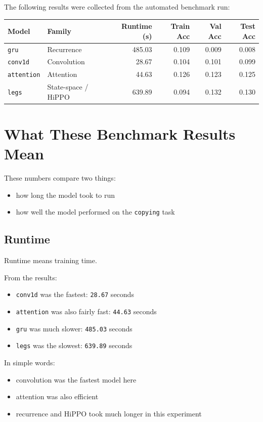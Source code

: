 \documentclass[12pt]{article}
\begin{document}
The following results were collected from the automated benchmark run:

\begin{center}
\begin{tabular}{l l r r r r}
\toprule
Model & Family & Runtime (s) & Train Acc & Val Acc & Test Acc \\
\midrule
\texttt{gru} & Recurrence & 485.03 & 0.109 & 0.009 & 0.008 \\
\texttt{conv1d} & Convolution & 28.67 & 0.104 & 0.101 & 0.099 \\
\texttt{attention} & Attention & 44.63 & 0.126 & 0.123 & 0.125 \\
\texttt{legs} & State-space / HiPPO & 639.89 & 0.094 & 0.132 & 0.130 \\
\bottomrule
\end{tabular}
\end{center}

\section*{What These Benchmark Results Mean}

These numbers compare two things:

\begin{itemize}
    \item how long the model took to run
    \item how well the model performed on the \texttt{copying} task
\end{itemize}

\subsection*{Runtime}

Runtime means training time.

From the results:

\begin{itemize}
    \item \texttt{conv1d} was the fastest: \texttt{28.67} seconds
    \item \texttt{attention} was also fairly fast: \texttt{44.63} seconds
    \item \texttt{gru} was much slower: \texttt{485.03} seconds
    \item \texttt{legs} was the slowest: \texttt{639.89} seconds
\end{itemize}

In simple words:

\begin{itemize}
    \item convolution was the fastest model here
    \item attention was also efficient
    \item recurrence and HiPPO took much longer in this experiment
\end{itemize}
\end{document}
